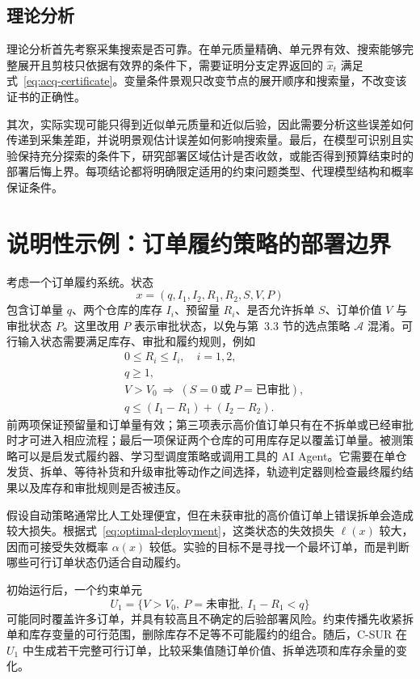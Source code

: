\documentclass[UTF8,11pt,a4paper,fontset=none]{ctexart}
\newcommand{\Aacq}{\mathcal A}
\newcommand{\1}{\mathbf 1}
\begin{document}
\subsection{理论分析}

理论分析首先考察采集搜索是否可靠。在单元质量精确、单元界有效、搜索能够完整展开且剪枝只依据有效界的条件下，需要证明分支定界返回的 $\widehat x_t$ 满足式~\eqref{eq:acq-certificate}。变量条件景观只改变节点的展开顺序和搜索量，不改变该证书的正确性。

其次，实际实现可能只得到近似单元质量和近似后验，因此需要分析这些误差如何传递到采集差距，并说明景观估计误差如何影响搜索量。最后，在模型可识别且实验保持充分探索的条件下，研究部署区域估计是否收敛，或能否得到预算结束时的部署后悔上界。每项结论都将明确限定适用的约束问题类型、代理模型结构和概率保证条件。

\section{说明性示例：订单履约策略的部署边界}

考虑一个订单履约系统。状态
\begin{equation}
  x=(q,I_1,I_2,R_1,R_2,S,V,P)
\end{equation}
包含订单量 $q$、两个仓库的库存 $I_i$、预留量 $R_i$、是否允许拆单 $S$、订单价值 $V$ 与审批状态 $P$。这里改用 $P$ 表示审批状态，以免与第~3.3 节的选点策略 $\Aacq$ 混淆。可行输入状态需要满足库存、审批和履约规则，例如
\begin{align}
  &0\leq R_i\leq I_i,\quad i=1,2,\\
  &q\geq1,\\
  &V>V_0\ \Longrightarrow\
    (S=0\ \text{或}\ P=\text{已审批}),\\
  &q\leq(I_1-R_1)+(I_2-R_2).
\end{align}
前两项保证预留量和订单量有效；第三项表示高价值订单只有在不拆单或已经审批时才可进入相应流程；最后一项保证两个仓库的可用库存足以覆盖订单量。被测策略可以是启发式履约器、学习型调度策略或调用工具的 AI Agent。它需要在单仓发货、拆单、等待补货和升级审批等动作之间选择，轨迹判定器则检查最终履约结果以及库存和审批规则是否被违反。

假设自动策略通常比人工处理便宜，但在未获审批的高价值订单上错误拆单会造成较大损失。根据式~\eqref{eq:optimal-deployment}，这类状态的失效损失 $\ell(x)$ 较大，因而可接受失效概率 $\alpha(x)$ 较低。实验的目标不是寻找一个最坏订单，而是判断哪些可行订单状态仍适合自动履约。

初始运行后，一个约束单元
\begin{equation}
  U_1=\{V>V_0,\ P=\text{未审批},\ I_1-R_1<q\}
\end{equation}
可能同时覆盖许多订单，并具有较高且不确定的后验部署风险。约束传播先收紧拆单和库存变量的可行范围，删除库存不足等不可能履约的组合。随后，C-SUR 在 $U_1$ 中生成若干完整可行订单，比较采集值随订单价值、拆单选项和库存余量的变化。
\end{document}
